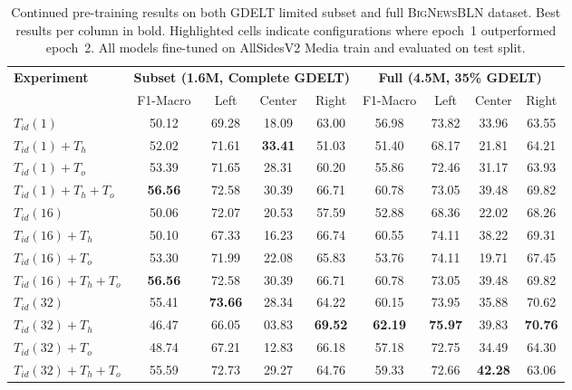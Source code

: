 \begin{table}[ht]
\centering
\footnotesize
\begin{tabular}{@{}lcccccccc@{}}
\toprule
\textbf{Experiment} & \multicolumn{4}{c}{\textbf{Subset (1.6M, Complete GDELT)}} & \multicolumn{4}{c}{\textbf{Full (4.5M, 35\% GDELT)}} \\
 & F1-Macro & Left & Center & Right & F1-Macro & Left & Center & Right \\
\midrule
$T_{id}(1)$          & 50.12 & 69.28 & 18.09 & 63.00 & 56.98 & 73.82 & 33.96 & 63.55 \\
$T_{id}(1) + T_h$    & \cellcolor{blue!15}52.02 & \cellcolor{blue!15}71.61 & \cellcolor{blue!15}\textbf{33.41} & \cellcolor{blue!15}51.03 & 51.40 & 68.17 & 21.81 & 64.21 \\
$T_{id}(1) + T_o$    & 53.39 & 71.65 & 28.31 & 60.20 & 55.86 & 72.46 & 31.17 & 63.93 \\
$T_{id}(1) + T_h + T_o$ & \textbf{56.56} & 72.58 & 30.39 & 66.71 & 60.78 & 73.05 & 39.48 & 69.82 \\
\midrule
$T_{id}(16)$         & 50.06 & 72.07 & 20.53 & 57.59 & 52.88 & 68.36 & 22.02 & 68.26 \\
$T_{id}(16) + T_h$   & 50.10 & 67.33 & 16.23 & 66.74 & \cellcolor{blue!15}60.55 & \cellcolor{blue!15}74.11 & \cellcolor{blue!15}38.22 & \cellcolor{blue!15}69.31 \\
$T_{id}(16) + T_o$   & 53.30 & 71.99 & 22.08 & 65.83 & 53.76 & 74.11 & 19.71 & 67.45 \\
$T_{id}(16) + T_h + T_o$ & \textbf{56.56} & 72.58 & 30.39 & 66.71 & 60.78 & 73.05 & 39.48 & 69.82 \\
\midrule
$T_{id}(32)$         & 55.41 & \textbf{73.66} & 28.34 & 64.22 & 60.15 & 73.95 & 35.88 & 70.62 \\
$T_{id}(32) + T_h$   & 46.47 & 66.05 & 03.83 & \textbf{69.52} & \textbf{62.19} & \textbf{75.97} & 39.83 & \textbf{70.76} \\
$T_{id}(32) + T_o$   & 48.74 & 67.21 & 12.83 & 66.18 & \cellcolor{blue!15}57.18 & \cellcolor{blue!15}72.75 & \cellcolor{blue!15}34.49 & \cellcolor{blue!15}64.30 \\
$T_{id}(32) + T_h + T_o$ & \cellcolor{blue!15}55.59 & \cellcolor{blue!15}72.73 & \cellcolor{blue!15}29.27 & \cellcolor{blue!15}64.76 & 59.33 & 72.66 & \textbf{42.28} & 63.06 \\
\bottomrule
\end{tabular}
\caption{Continued pre-training results on both GDELT limited subset and full \textsc{BigNewsBLN} dataset. Best results per column in bold. \colorbox{blue!15}{Highlighted} cells indicate configurations where epoch~1 outperformed epoch~2. All models fine-tuned on AllSidesV2 Media train and evaluated on test split.}
\label{tab:pretraining-combined}
\end{table}

